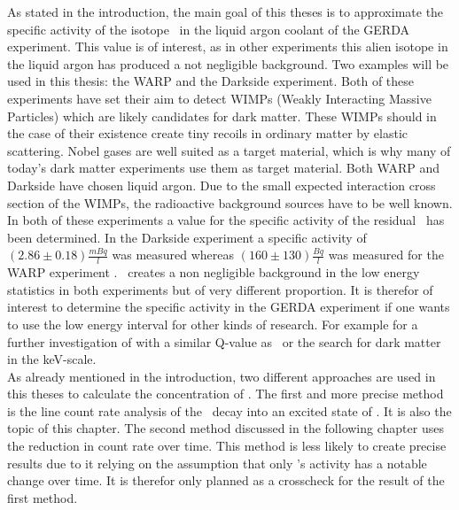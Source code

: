 \documentclass[encoding=utf8,british]{tumphthesis}
\begin{document}
As stated in the introduction, the main goal of this theses is to approximate the specific activity of the isotope \Kr\ in the liquid argon coolant of the GERDA experiment. 
This value is of interest, as in other experiments this alien isotope in the liquid argon has produced a not negligible background. 
Two examples will be used in this thesis: the WARP and the Darkside experiment.
Both of these experiments have set their aim to detect WIMPs (Weakly Interacting Massive Particles) which are likely candidates for dark matter.
These WIMPs should in the case of their existence create tiny recoils in ordinary matter by elastic scattering.
Nobel gases are well suited as a target material, which is why many of today's dark matter experiments use them as target material.
Both WARP and Darkside have chosen liquid argon.
Due to the small expected interaction cross section of the WIMPs, the radioactive background sources have to be well known.
In both of these experiments a value for the specific activity of the residual \Kr\ has been determined.
In the Darkside experiment a specific activity of  \((2.86\pm0.18) \frac{\unit{mBq}}{\unit{l}}\)  \cite{agnes_results_2016} was measured whereas  \((160\pm130)\frac{\unit{Bq}}{\unit{l}}\) was measured for the WARP experiment \cite{benetti_measurement_2006}.
\Kr\ creates a non negligible background in the low energy statistics in both experiments but of very different proportion. 
It is therefor of interest to determine the specific activity in the GERDA experiment if one wants to use the low energy interval for other kinds of research.
For example for a further investigation of  with a similar Q-value as \Kr\ or the search for dark matter in the keV-scale.
\\

As already mentioned in the introduction, two different approaches are used in this theses to calculate the concentration of \Kr. 
The first and more precise method is the line count rate analysis of the \Kr\ decay into an excited state of . 
It is also the topic of this chapter.
The second method discussed in the following chapter uses the reduction in count rate over time. 
This method is less likely to create precise results due to it relying on the assumption that only \Kr's activity has a notable change over time.
It is therefor only planned as a crosscheck for the result of the first method.
\\
\end{document}
